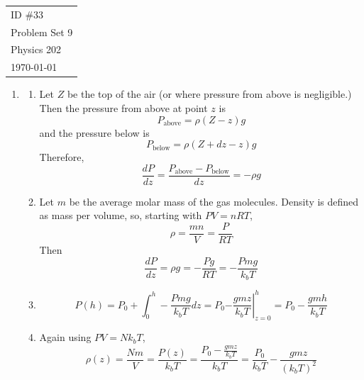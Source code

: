 \documentclass[fleqn]{article}[12pt]
\begin{document}
    \begin{tabular}{l}
        ID \#33 \\
        Problem Set 9 \\
        Physics 202 \\
        \today
    \end{tabular}

\begin{enumerate}
    \item \begin{enumerate}
        \item Let $Z$ be the top of the air (or where pressure from above is negligible.) Then the pressure from above at point $z$ is
        \begin{equation*}
            P_{\text{above}} = \rho(Z-z)g
        \end{equation*}
        and the pressure below is
        \begin{equation*}
            P_{\text{below}} = \rho(Z+dz-z)g
        \end{equation*}
        Therefore,
        \begin{equation*}
            \frac{dP}{dz} = \frac{P_{\text{above}}-P_{\text{below}}}{dz} = -\rho g
        \end{equation*}

        \item Let $m$ be the average molar mass of the gas molecules. Density is defined as mass per volume, so, starting with $PV=nRT$,
        \begin{equation*}
            \rho = \frac{mn}{V} = \frac{P}{RT}
        \end{equation*}
        Then
        \begin{equation*}
            \frac{dP}{dz} = \rho g = -\frac{Pg}{RT} = -\frac{Pmg}{k_bT}
        \end{equation*}

        \item
        \begin{equation*}
            P(h) = P_0 + \int_{0}^{h} -\frac{Pmg}{k_bT}dz = P_0 \left.-\frac{g m z}{k_b T}\right|_{z=0}^{h} = P_0 - \frac{gmh}{k_b T}
        \end{equation*}

        \item Again using $PV=Nk_bT$,
        \begin{equation*}
            \rho(z) = \frac{N m}{V} = \frac{P(z)}{k_b T} = \frac{P_0 - \frac{gmz}{k_b T}}{k_b T} =
            \frac{P_0}{k_b T} - \frac{gmz}{(k_b T)^2}
        \end{equation*}


\end{enumerate}
\end{enumerate}
\end{document}
